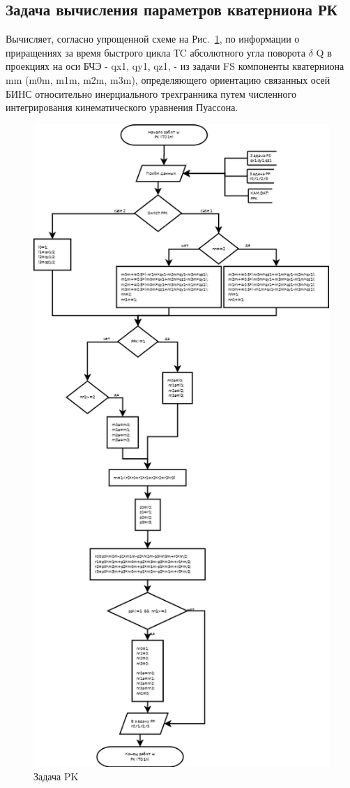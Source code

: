 \subsection{Задача вычисления параметров кватерниона РК}
Вычисляет, согласно упрощенной схеме на Рис.~\ref{fig:PK},  по  информации о приращениях за время быстрого цикла ТC  абсолютного угла поворота $\delta$ Q в проекциях на оси БЧЭ -  qx1, qy1, qz1, - из задачи  FS 
компоненты кватерниона mm (m0m, m1m, m2m, m3m), определяющего  ориентацию связанных осей БИНС относительно инерциального трехгранника путем численного 
интегрирования кинематического уравнения Пуассона.
\begin{figure}[H]
    \centering
    \includegraphics[width=0.7\linewidth]{images/PK.png}
    \caption{Задача PK}
    \label{fig:PK}
\end{figure}

